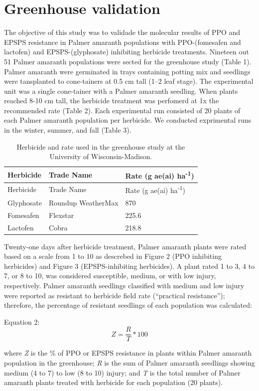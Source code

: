 \documentclass[]{article}
\begin{document}
\pagebreak

\section{Greenhouse validation}\label{greenhouse-validation}

The objective of this study was to validade the molecular results of PPO
and EPSPS resistance in Palmer amaranth populations with PPO-(fomesafen
and lactofen) and EPSPS-(glyphosate) inhibiting herbicide treatments.
Nineteen out 51 Palmer amaranth populations were sected for the
greenhouse study (Table 1). Palmer amaranth were germinated in trays
containing potting mix and seedlings were tansplanted to cone-tainers at
0.5 cm tall (1--2 leaf stage). The experimental unit was a single
cone-tainer with a Palmer amaranth seedling. When plants reached 8-10 cm
tall, the herbicide treatment was perfomerd at 1x the recommended rate
(Table 2). Each experimental run consisted of 20 plants of each Palmer
amaranth population per herbicide. We conducted exprimental runs in the
winter, summer, and fall (Table 3).

\begin{longtable}[]{@{}lll@{}}
\caption{Herbicide and rate used in the greenhouse study at the
University of Wisconsin-Madison.}\tabularnewline
\toprule
Herbicide & Trade Name & Rate (g ae(ai)
ha\textsuperscript{-1})\tabularnewline
\midrule
\endfirsthead
\toprule
Herbicide & Trade Name & Rate (g ae(ai)
ha\textsuperscript{-1})\tabularnewline
\midrule
\endhead
Glyphosate & Roundup WeatherMax & 870\tabularnewline
Fomesafen & Flexstar & 225.6\tabularnewline
Lactofen & Cobra & 218.8\tabularnewline
\bottomrule
\end{longtable}

Twenty-one days after herbicide treatment, Palmer amaranth plants were
rated based on a scale from 1 to 10 as descrebed in Figure 2 (PPO
inhibiting herbicides) and Figure 3 (EPSPS-inhibiting herbicides). A
plant rated 1 to 3, 4 to 7, or 8 to 10, was considered susceptible,
medium, or with low injury, respectively. Palmer amaranth seedlings
classified with medium and low injury were reported as resistant to
herbicide field rate (``practical resistance''); therefore, the
percentage of resistant seedlings of each population was calculated:

Equation 2: \[Z=\frac{R}{T} * 100 \]

where \emph{Z} is the \% of PPO or EPSPS resistance in plants within
Palmer amaranth population in the greenhouse; \emph{R} is the sum of
Palmer amaranth seedlings showing medium (4 to 7) to low (8 to 10)
injury; and \emph{T} is the total number of Palmer amaranth plants
treated with herbicide for each population (20 plants).
\end{document}

